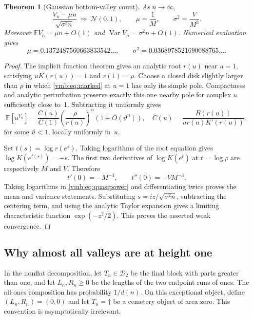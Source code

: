 \documentclass[11pt,a4paper]{article}
\numberwithin{equation}{section}
\newtheorem{theorem}{Theorem}[section]
\theoremstyle{definition}\newtheorem{definition}[theorem]{Definition}
\theoremstyle{remark}\newtheorem{remark}[theorem]{Remark}
\newcommand{\E}{\mathbb E}
\newcommand{\Var}{\operatorname{Var}}
\newcommand{\calD}{\mathcal D}
\begin{document}
\begin{theorem}[Gaussian bottom-valley count]\label{vmb:thm:CLT}
As \(n\to\infty\),
\begin{equation}\label{vmb:eq:CLT}
\frac{V_n-\mu n}{\sqrt{\sigma^2n}}
\ \Longrightarrow\ \mathcal N(0,1),
\qquad \mu=\frac1M,\qquad \sigma^2=\frac{V}{M^3}.
\end{equation}
Moreover \(\E V_n=\mu n+O(1)\) and
\(\Var V_n=\sigma^2n+O(1)\). Numerical evaluation gives
\[
\mu=0.1372487560663833542\ldots,
\qquad \sigma^2=0.0368978521690088765\ldots.
\]
\end{theorem}
\begin{proof}
The implicit function theorem gives an analytic root \(r(u)\) near
\(u=1\), satisfying \(uK(r(u))=1\) and \(r(1)=\rho\).
Choose a closed disk slightly larger than \(\rho\) in which
\eqref{vmb:eq:marked} at \(u=1\) has only its simple pole. Compactness and
analytic perturbation preserve exactly this one nearby pole for complex
\(u\) sufficiently close to~1. Subtracting it uniformly gives
\begin{equation}\label{vmb:eq:quasipower}
\E[u^{V_n}]=\frac{C(u)}{C(1)}
\left(\frac{\rho}{r(u)}\right)^n(1+O(\vartheta^n)),
\quad
C(u)=\frac{B(r(u))}{u r(u)K'(r(u))},
\end{equation}
for some \(\vartheta<1\), locally uniformly in~\(u\).

Set \(t(s)=\log r(e^s)\). Taking logarithms of the root equation gives
\(\log K(e^{t(s)})=-s\). The first two derivatives of
\(\log K(e^t)\) at \(t=\log\rho\) are respectively \(M\) and \(V\).
Therefore
\[
t'(0)=-M^{-1},\qquad t''(0)=-VM^{-3}.
\]
Taking logarithms in \eqref{vmb:eq:quasipower} and differentiating twice
proves the mean and variance statements. Substituting
\(s=iz/\sqrt{\sigma^2n}\), subtracting the centering term, and using
the analytic Taylor expansion gives a limiting characteristic function
\(\exp(-z^2/2)\). This proves the asserted weak convergence.
\end{proof}

\subsection{Why almost all valleys are at height one}
In the nonflat decomposition, let \(T_n\in\calD_2\) be the final
block with parts greater than one, and let \(L_n,R_n\geq0\) be the
lengths of the two endpoint runs of ones. The all-ones composition has
probability \(1/d(n)\). On this exceptional object, define
\((L_n,R_n)=(0,0)\) and let \(T_n=\dagger\) be a cemetery object of
area zero. This convention is asymptotically irrelevant.
\end{document}
